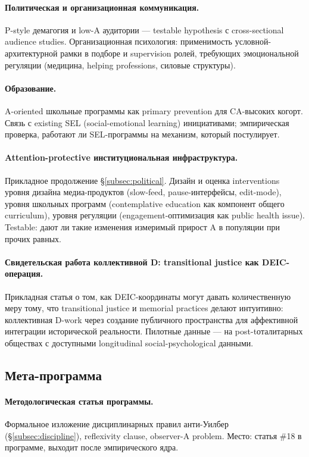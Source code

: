 \paragraph{Политическая и организационная коммуникация.} P-style демагогия и low-A аудитории --- testable hypothesis с cross-sectional audience studies. Организационная психология: применимость условной-архитектурной рамки в подборе и supervision ролей, требующих эмоциональной регуляции (медицина, helping professions, силовые структуры).

\paragraph{Образование.} A-oriented школьные программы как primary prevention для CA-высоких когорт. Связь с existing SEL (social-emotional learning) инициативами; эмпирическая проверка, работают ли SEL-программы на механизм, который \DEIC{} постулирует.

\paragraph{Attention-protective институциональная инфраструктура.} Прикладное продолжение §\ref{subsec:political}. Дизайн и оценка interventions уровня дизайна медиа-продуктов (slow-feed, pause-интерфейсы, edit-mode), уровня школьных программ (contemplative education как компонент общего curriculum), уровня регуляции (engagement-оптимизация как public health issue). Testable: дают ли такие изменения измеримый прирост A в популяции при прочих равных.

\paragraph{Свидетельская работа коллективной D: transitional justice как DEIC-операция.} Прикладная статья о том, как DEIC-координаты могут давать количественную меру тому, что transitional justice и memorial practices делают интуитивно: коллективная D-work через создание публичного пространства для аффективной интеграции исторической реальности. Пилотные данные --- на post-tоталитарных обществах с доступными longitudinal social-psychological данными.

\subsection{Мета-программа}

\paragraph{Методологическая статья программы.} Формальное изложение дисциплинарных правил анти-Уилбер (§\ref{subsec:discipline}), reflexivity clause, observer-A problem. Место: статья \#18 в программе, выходит после эмпирического ядра.


